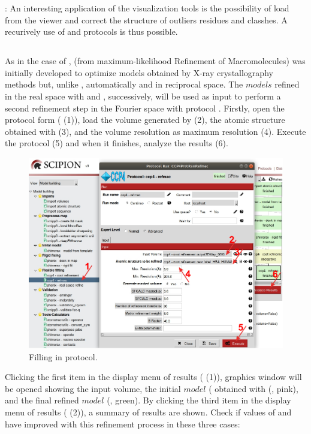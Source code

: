   : An interesting application of the \phenix {} visualization tools is the possibility of load \coot from the \phenix viewer and correct the structure of outliers residues and classhes. A recurively use of \phenix {} and \coot protocols is thus possible.
  
  \subsection*{  }
  
  As in the case of \coot,  (from maximum-likelihood Refinement of Macromolecules) was initially developed to optimize models obtained by X-ray crystallography methods but, unlike \coot, automatically and in reciprocal space. The $models$ refined in the real space with \coot and \phenix {}, successively, will be used as input to perform a second refinement step in the Fourier space with  protocol . Firstly, open the  protocol form ( (1)), load the volume generated by \coot (2), the atomic structure obtained with \phenix {} (3), and the volume resolution as maximum resolution (4). Execute the protocol (5) and when it finishes, analyze the results (6).
  
  \begin{figure}[H]
  \centering 
  \captionsetup{width=.9\linewidth} 
  \includegraphics[width=1\textwidth]{Images/Fig31}
  \caption{Filling in  protocol.}
  \label{fig:refmac_protocol}
  \end{figure}
  Clicking the first item in the display menu of results ( (1)), \chimera graphics window will be opened showing the input volume, the initial $model$ ( obtained with \coot (, pink), and the final  refined $model$ (, green). By clicking the third item in the display menu of results ( (2)), a summary of  results are shown. Check if values of  and  have improved with this refinement process in these three cases:
  
